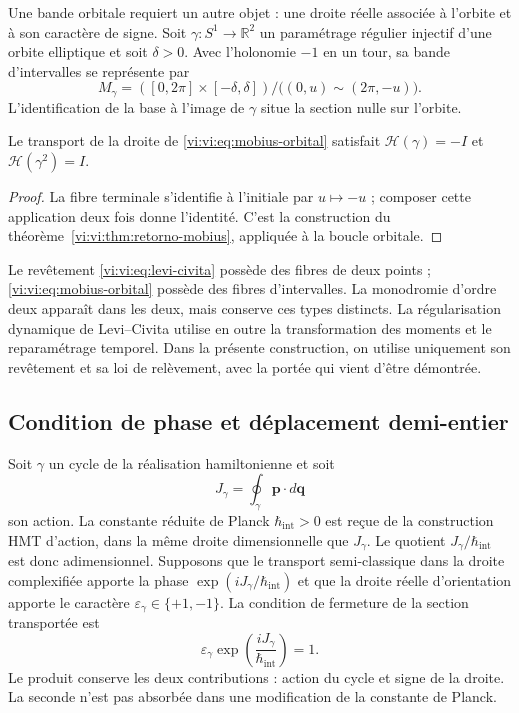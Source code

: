 Une bande orbitale requiert un autre objet : une droite réelle
associée à l’orbite et à son caractère de signe. Soit
$\gamma:S^1\to\mathbb R^2$ un paramétrage régulier
injectif d’une orbite elliptique et soit $\delta>0$. Avec
l’holonomie $-1$ en un tour, sa bande d’intervalles se
représente par
\begin{equation}
 M_\gamma=([0,2\pi]\times[-\delta,\delta])/
          \bigl((0,u)\sim(2\pi,-u)\bigr).
 \label{vi:vi:eq:mobius-orbital}
\end{equation}
L’identification de la base à l’image de $\gamma$
situe la section nulle sur l’orbite.

\begin{proposition}
\label{vi:vi:prop:holonomia-orbital}
Le transport de la droite de \eqref{vi:vi:eq:mobius-orbital}
satisfait
$\mathcal H(\gamma)=-I$ et $\mathcal H(\gamma^2)=I$.
\end{proposition}
\begin{proof}
La fibre terminale s’identifie à l’initiale par
$u\mapsto-u$ ; composer cette application deux fois donne l’identité.
C’est la construction du
théorème~\ref{vi:vi:thm:retorno-mobius}, appliquée à la boucle orbitale.
\end{proof}

Le revêtement \eqref{vi:vi:eq:levi-civita} possède des fibres de deux
points ; \eqref{vi:vi:eq:mobius-orbital} possède des fibres
d’intervalles. La monodromie d’ordre deux apparaît dans les deux,
mais conserve ces types distincts. La régularisation
dynamique de Levi--Civita utilise en outre la transformation
des moments et le reparamétrage temporel. Dans la présente
construction, on utilise uniquement son revêtement et sa loi de
relèvement, avec la portée qui vient d’être démontrée.

\subsection{Condition de phase et déplacement demi-entier}
\label{vi:vi:subsec:sommerfeld}

Soit $\gamma$ un cycle de la réalisation hamiltonienne et soit
\begin{equation}
 J_\gamma=\oint_\gamma\mathbf p\cdot d\mathbf q
 \label{vi:vi:eq:accion-ciclo}
\end{equation}
son action. La constante réduite de Planck
$\hbar_{\mathrm{int}}>0$ est reçue de la construction HMT
d’action, dans la même droite dimensionnelle que $J_\gamma$.
Le quotient $J_\gamma/\hbar_{\mathrm{int}}$ est donc
adimensionnel. Supposons que le transport semi-classique dans la
droite complexifiée apporte la phase
$\exp(iJ_\gamma/\hbar_{\mathrm{int}})$ et que la droite réelle
d’orientation apporte le caractère
$\varepsilon_\gamma\in\{+1,-1\}$. La condition de fermeture
de la section transportée est
\begin{equation}
 \varepsilon_\gamma
       \exp\!\left(\frac{iJ_\gamma}{\hbar_{\mathrm{int}}}\right)=1.
 \label{vi:vi:eq:cierre-sommerfeld}
\end{equation}
Le produit conserve les deux contributions : action du
cycle et signe de la droite. La seconde n’est pas absorbée dans une
modification de la constante de Planck.

